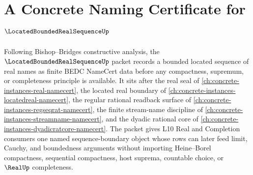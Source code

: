 \chapter{A Concrete Naming Certificate for $\LocatedBoundedRealSequenceUp$}
\label{ch:concrete-instances-located-bounded-real-sequence-namecert}

Following Bishop--Bridges constructive analysis, the $\LocatedBoundedRealSequenceUp$ packet records a bounded located sequence of real names as finite BEDC NameCert data before any compactness, supremum, or completeness principle is available. It sits after the real seal of \autoref{ch:concrete-instances-real-namecert}, the located real boundary of \autoref{ch:concrete-instances-locatedreal-namecert}, the regular rational readback surface of \autoref{ch:concrete-instances-regseqrat-namecert}, the finite stream-name discipline of \autoref{ch:concrete-instances-streamname-namecert}, and the dyadic rational core of \autoref{ch:concrete-instances-dyadicratcore-namecert}. The packet gives L10 Real and Completion consumers one named sequence-boundary object whose rows can later feed limit, Cauchy, and boundedness arguments without importing Heine--Borel compactness, sequential compactness, host suprema, countable choice, or $\RealUp$ completeness.

